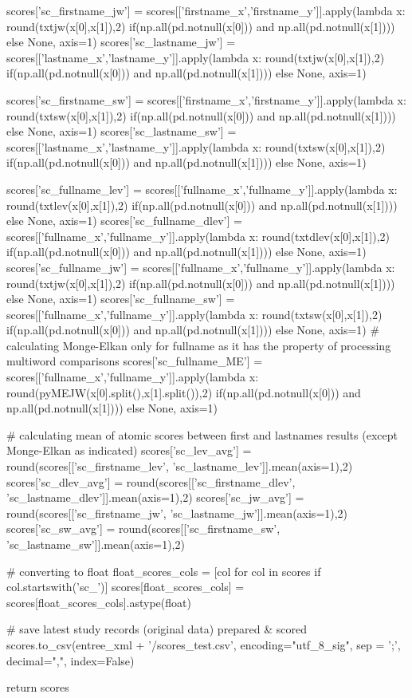 \documentclass[a4paper,12pt,twoside]{book}
\begin{document}
\begin{python}
  scores['sc_firstname_jw'] = scores[['firstname_x','firstname_y']].apply(lambda x: round(txtjw(x[0],x[1]),2) if(np.all(pd.notnull(x[0])) and np.all(pd.notnull(x[1]))) else None, axis=1)
  scores['sc_lastname_jw'] = scores[['lastname_x','lastname_y']].apply(lambda x: round(txtjw(x[0],x[1]),2) if(np.all(pd.notnull(x[0])) and np.all(pd.notnull(x[1]))) else None, axis=1)

  scores['sc_firstname_sw'] = scores[['firstname_x','firstname_y']].apply(lambda x: round(txtsw(x[0],x[1]),2) if(np.all(pd.notnull(x[0])) and np.all(pd.notnull(x[1]))) else None, axis=1)
  scores['sc_lastname_sw'] = scores[['lastname_x','lastname_y']].apply(lambda x: round(txtsw(x[0],x[1]),2) if(np.all(pd.notnull(x[0])) and np.all(pd.notnull(x[1]))) else None, axis=1)

  scores['sc_fullname_lev'] = scores[['fullname_x','fullname_y']].apply(lambda x: round(txtlev(x[0],x[1]),2) if(np.all(pd.notnull(x[0])) and np.all(pd.notnull(x[1]))) else None, axis=1)
  scores['sc_fullname_dlev'] = scores[['fullname_x','fullname_y']].apply(lambda x: round(txtdlev(x[0],x[1]),2) if(np.all(pd.notnull(x[0])) and np.all(pd.notnull(x[1]))) else None, axis=1)
  scores['sc_fullname_jw'] = scores[['fullname_x','fullname_y']].apply(lambda x: round(txtjw(x[0],x[1]),2) if(np.all(pd.notnull(x[0])) and np.all(pd.notnull(x[1]))) else None, axis=1)
  scores['sc_fullname_sw'] = scores[['fullname_x','fullname_y']].apply(lambda x: round(txtsw(x[0],x[1]),2) if(np.all(pd.notnull(x[0])) and np.all(pd.notnull(x[1]))) else None, axis=1)
  # calculating Monge-Elkan only for fullname as it has the property of processing multiword comparisons
  scores['sc_fullname_ME'] = scores[['fullname_x','fullname_y']].apply(lambda x: round(pyMEJW(x[0].split(),x[1].split()),2) if(np.all(pd.notnull(x[0])) and np.all(pd.notnull(x[1]))) else None, axis=1)

  # calculating mean of atomic scores between first and lastnames results (except Monge-Elkan as indicated)
  scores['sc_lev_avg'] = round(scores[['sc_firstname_lev', 'sc_lastname_lev']].mean(axis=1),2)
  scores['sc_dlev_avg'] = round(scores[['sc_firstname_dlev', 'sc_lastname_dlev']].mean(axis=1),2)
  scores['sc_jw_avg'] = round(scores[['sc_firstname_jw', 'sc_lastname_jw']].mean(axis=1),2)
  scores['sc_sw_avg'] = round(scores[['sc_firstname_sw', 'sc_lastname_sw']].mean(axis=1),2)

  
  # converting to float
  float_scores_cols = [col for col in scores if col.startswith('sc_')]
  scores[float_scores_cols] = scores[float_scores_cols].astype(float)
  
  # save latest study records (original data) prepared & scored
  scores.to_csv(entree_xml + '/scores_test.csv', encoding="utf_8_sig", sep = ';', decimal=",", index=False)

  return scores    		    
    		    \end{python}
    		    \pagebreak
    	
\end{document}
